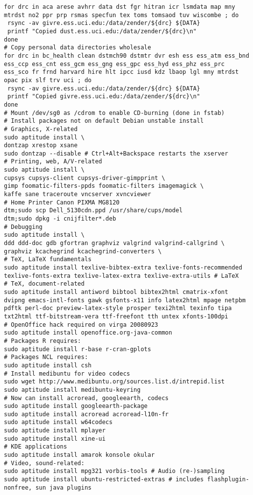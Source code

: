 \documentclass[12pt,twoside]{article}
\begin{document}
\begin{verbatim}
for drc in aca arese avhrr data dst fgr hitran icr lsmdata map mny mtrdst no2 ppr prp rsmas specfun tex toms tomsaod tuv wiscombe ; do
 rsync -av givre.ess.uci.edu:/data/zender/${drc} ${DATA}
 printf "Copied dust.ess.uci.edu:/data/zender/${drc}\n"
done
# Copy personal data directories wholesale
for drc in bc_health clean dstmch90 dstmtr dvr esh ess ess_atm ess_bnd ess_ccp ess_cnt ess_gcm ess_gng ess_gpc ess_hyd ess_phz ess_prc ess_sco fr frnd harvard hire hlt ipcc iusd kdz lbaop lgl mny mtrdst opac pix slf trv uci ; do
 rsync -av givre.ess.uci.edu:/data/zender/${drc} ${DATA}
 printf "Copied givre.ess.uci.edu:/data/zender/${drc}\n"
done
# Mount /dev/sg0 as /cdrom to enable CD-burning (done in fstab)
# Install packages not on default Debian unstable install 
# Graphics, X-related
sudo aptitude install \
dontzap xrestop xsane
sudo dontzap --disable # Ctrl+Alt+Backspace restarts the xserver
# Printing, web, A/V-related
sudo aptitude install \
cupsys cupsys-client cupsys-driver-gimpprint \
gimp foomatic-filters-ppds foomatic-filters imagemagick \
kaffe sane traceroute vncserver xvncviewer
# Home Printer Canon PIXMA MG8120
dtm;sudo scp Dell_5130cdn.ppd /usr/share/cups/model
dtm;sudo dpkg -i cnijfilter*.deb
# Debugging
sudo aptitude install \
ddd ddd-doc gdb gfortran graphviz valgrind valgrind-callgrind \
graphviz kcachegrind kcachegrind-converters \
# TeX, LaTeX fundamentals
sudo aptitude install texlive-bibtex-extra texlive-fonts-recommended texlive-fonts-extra texlive-latex-extra texlive-extra-utils # LaTeX
# TeX, document-related
sudo aptitude install antiword bibtool bibtex2html cmatrix-xfont dvipng emacs-intl-fonts gawk gsfonts-x11 info latex2html mpage netpbm pdftk perl-doc preview-latex-style prosper texi2html texinfo tipa txt2html ttf-bitstream-vera ttf-freefont tth untex xfonts-100dpi 
# OpenOffice hack required on virga 20080923
sudo aptitude install openoffice.org-java-common
# Packages R requires:
sudo aptitude install r-base r-cran-gplots
# Packages NCL requires:
sudo aptitude install csh
# Install medibuntu for video codecs
sudo wget http://www.medibuntu.org/sources.list.d/intrepid.list
sudo aptitude install medibuntu-keyring
# Now can install acroread, googleearth, codecs
sudo aptitude install googleearth-package
sudo aptitude install acroread acroread-l10n-fr
sudo aptitude install w64codecs
sudo aptitude install mplayer
sudo aptitude install xine-ui
# KDE applications
sudo aptitude install amarok konsole okular
# Video, sound-related: 
sudo aptitude install mpg321 vorbis-tools # Audio (re-)sampling
sudo aptitude install ubuntu-restricted-extras # includes flashplugin-nonfree, sun java plugins

\end{verbatim}
\end{document}
